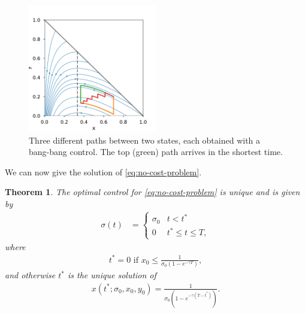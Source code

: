 \documentclass[english,12pt,letter]{article}
\newtheorem{thm}{Theorem}
\newcommand{\Rnot}{\sigma_0}
\begin{document}
\begin{figure}
    \centering
    \includegraphics[width=0.5\textwidth]{figures/threepaths.pdf}
    \caption{Three different paths between two states, each obtained
    with a bang-bang control.  The top (green) path arrives in the shortest time.\label{fig:bangbangtraj}}
\end{figure}
We can now give the solution of \eqref{eq:no-cost-problem}.
\begin{thm} \label{thm:no-cost}
The optimal control for \eqref{eq:no-cost-problem} is unique and is given by
\begin{align}
    \sigma(t) & = \begin{cases}  
        \Rnot & t<t^* \\
        0 & t^* \le  t \le T,
    \end{cases}
\end{align}
where 
\begin{align} \label{eq:dropcond}
    t^*=0 \text{ if } x_0\le\frac{1}{\sigma_0(1-e^{-\gamma T})},
\end{align}
and otherwise $t^*$ is the unique solution of
\begin{align} \label{xtstar}
    x(t^*;\Rnot,x_0,y_0) = \frac{1}{\sigma_0(1-e^{-\gamma(T-t^*)})}.
\end{align}
\end{thm}
\end{document}
